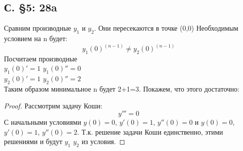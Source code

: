 \documentclass{article}
\begin{document}
\subsection{С. \S5: 28a }
Сравним производные $y_1$ и $y_2$. Они пересекаются в точке (0,0) Необходимым условием на n будет:
$$
y_1(0)^{(n-1)} \neq y_2(0)^{(n-1)}
$$
Посчитаем производные \\
$y_1(0)'=1$ $y_1(0)''=0$\\  
$y_2(0)'=1$ $y_2(0)''=2$\\
Таким образом минимальное n будет 2+1=3. Покажем, что этого достаточно:
\begin{proof}
Рассмотрим задачу Коши:
\begin{equation}
y'''=0
\end{equation}
С начальными условиями $y(0)=0$, $y'(0)=1$, $y''(0)=0$ и $y(0)=0$, $y'(0)=1$, $y''(0)=2$. Т.к. решение задачи Коши единственно, этими решениями и будут $y_1$ $y_2$ из условия.
\end{proof}
\end{document}
